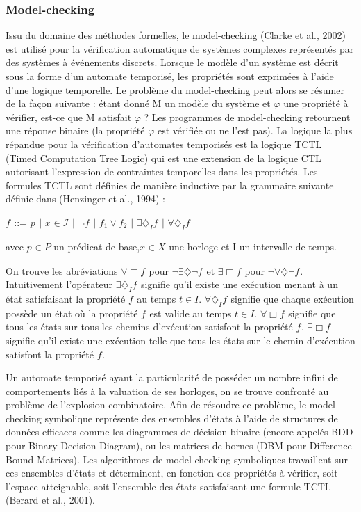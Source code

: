 \documentclass[french]{spimufcphdthesis}
\begin{document}
\subsubsection{Model-checking}

 Issu du domaine des méthodes formelles, le model-checking (Clarke et al., 2002) est utilisé pour la vérification automatique de systèmes complexes représentés par des
systèmes à événements discrets. Lorsque le modèle d’un système est décrit sous la forme d’un automate temporisé, les propriétés sont exprimées à l’aide d’une logique temporelle. Le problème du model-checking peut alors se résumer de la façon suivante : étant donné M un modèle du système et
$\varphi$ une propriété à vérifier, est-ce que M satisfait $\varphi$ ? Les programmes de model-checking retournent une réponse binaire (la propriété $\varphi$ est vérifiée ou ne l’est pas).
La logique la plus répandue pour la vérification d’automates temporisés est la logique TCTL (Timed Computation Tree Logic) qui est une extension de la logique CTL autorisant l’expression de contraintes temporelles dans les propriétés. Les formules TCTL sont définies de manière inductive par la grammaire suivante définie dans (Henzinger et al., 1994) :

\centerline{$f_{ }$ ::= $p_{ }$ $|$ $x_{ } \in \mathcal{I}$ $|$ $\neg f_{ }$ $|$ $f_{1} \vee f_{2}$ $|$ $\exists \diamondsuit_{I} f_{ } $ $|$ $\forall \diamondsuit_{I} f_{ } $}
avec $p_{ } \in P$ un prédicat de base,$x_{ } \in X $  une horloge et I un intervalle de temps.

On trouve les abréviations $\forall \Box f_{ }$ pour $\neg \exists \diamondsuit \neg f_{ }$ et $\exists \Box f_{ }$ pour $\neg \forall \diamondsuit \neg f_{ }$. Intuitivement
l’opérateur $\exists \diamondsuit_{I} f_{ }$ signifie qu’il existe une exécution menant à un état satisfaisant la
propriété $f_{ }$ au temps $t \in I$.
$\forall \diamondsuit_{I} f_{ }$ signifie que chaque exécution possède un état où la propriété $f_{ }$ est valide au temps $t \in I$.
$\forall \Box f_{ }$ signifie que tous les états sur tous les
chemins d’exécution satisfont la propriété $f_{ }$.
$\exists \Box f_{ } $ signifie qu’il existe une exécution
telle que tous les états sur le chemin d’exécution satisfont la propriété $f_{ }$.

Un automate temporisé ayant la particularité de posséder un nombre infini de comportements liés à la valuation de ses horloges, on se trouve confronté au problème
de l’explosion combinatoire. Afin de résoudre ce problème, le model-checking symbolique représente des ensembles d’états à l’aide de structures de données efficaces
comme les diagrammes de décision binaire (encore appelés BDD pour Binary Decision Diagram), ou les matrices de bornes (DBM pour Difference Bound Matrices).
Les algorithmes de model-checking symboliques travaillent sur ces ensembles d’états et déterminent, en fonction des propriétés à vérifier, soit l’espace atteignable, soit l’ensemble des états satisfaisant une formule TCTL (Berard et al., 2001).
\end{document}
